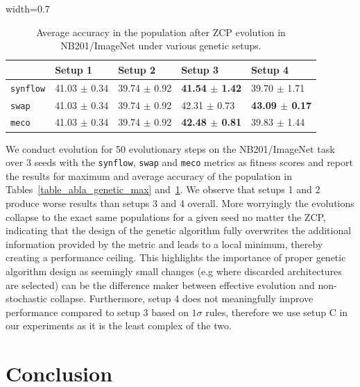 \documentclass[10pt]{article} %
\begin{document}
\begin{table}[h]
\centering
\caption{Average accuracy in the population after ZCP evolution in NB201/ImageNet under various genetic setups.}
\begin{adjustbox}{width=0.7\linewidth}
\begin{tabular}{m{2cm} | m{2.1cm} | m{2.1cm} | m{2.1cm} | m{2.1cm}}
    & Setup 1 & Setup 2 & Setup 3 & Setup 4\\
    \hline

    \texttt{synflow} & 41.03 $\pm$ 0.34 & 39.74 $\pm$ 0.92 & \textbf{41.54 $\pm$ 1.42} & 39.70 $\pm$ 1.71\\

    \texttt{swap} & 41.03 $\pm$ 0.34 & 39.74 $\pm$ 0.92 & 42.31 $\pm$ 0.73 & \textbf{43.09 $\pm$ 0.17}\\

    \texttt{meco} & 41.03 $\pm$ 0.34 & 39.74 $\pm$ 0.92 & \textbf{42.48 $\pm$ 0.81} & 39.83 $\pm$ 1.44\\

\end{tabular}
\end{adjustbox}
\label{table_abla_genetic_avg}
\end{table}

We conduct evolution for 50 evolutionary steps on the NB201/ImageNet task over 3 seeds with the \texttt{synflow}, \texttt{swap} and \texttt{meco} metrics as fitness scores and report the results for maximum and average accuracy of the population in Tables~\ref{table_abla_genetic_max} and~\ref{table_abla_genetic_avg}. We observe that setups 1 and 2 produce worse results than setups 3 and 4 overall. More worryingly the evolutions collapse to the exact same populations for a given seed no matter the ZCP, indicating that the design of the genetic algorithm fully overwrites the additional information provided by the metric and leads to a local minimum, thereby creating a performance ceiling. This highlights the importance of proper genetic algorithm design as seemingly small changes (e.g where discarded architectures are selected) can be the difference maker between effective evolution and non-stochastic collapse. Furthermore, setup 4 does not meaningfully improve performance compared to setup 3 based on $1\sigma$ rules, therefore we use setup C in our experiments as it is the least complex of the two.

\section{Conclusion}
\label{conclusion}
\end{document}

